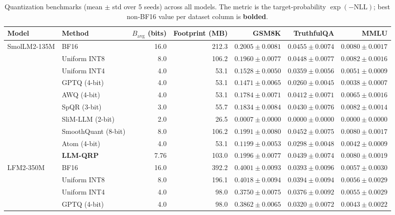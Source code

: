 \begin{table}[htbp]
  \centering
  \small
\caption{Quantization benchmarks (mean $\pm$ std over 5 seeds) across all models. The metric is the target-probability $\exp(-\text{NLL})$; best non-BF16 value per dataset column is \textbf{bolded}.}
  \label{tab:multiseed}
  \begin{tabular}{llrrrrr}
    \toprule
    \textbf{Model} & \textbf{Method} & $B_{\mathrm{avg}}$ (bits) & \textbf{Footprint (MB)} & \textbf{GSM8K} & \textbf{TruthfulQA} & \textbf{MMLU} \\
    \midrule
    SmolLM2-135M & BF16 & 16.0 & 212.3 & $0.2005 \pm 0.0081$ & $0.0455 \pm 0.0074$ & $0.0080 \pm 0.0017$ \\
     & Uniform INT8 & 8.0 & 106.2 & $0.1960 \pm 0.0077$ & $0.0448 \pm 0.0077$ & $0.0082 \pm 0.0016$ \\
     & Uniform INT4 & 4.0 & 53.1 & $0.1528 \pm 0.0050$ & $0.0359 \pm 0.0056$ & $0.0051 \pm 0.0009$ \\
     & GPTQ (4-bit) & 4.0 & 53.1 & $0.1471 \pm 0.0065$ & $0.0260 \pm 0.0045$ & $0.0038 \pm 0.0007$ \\
     & AWQ (4-bit) & 4.0 & 53.1 & $0.1784 \pm 0.0071$ & $0.0412 \pm 0.0071$ & $0.0065 \pm 0.0016$ \\
     & SpQR (3-bit) & 3.0 & 55.7 & $0.1834 \pm 0.0084$ & $0.0430 \pm 0.0076$ & \textbf{$0.0082 \pm 0.0014$} \\
     & SliM-LLM (2-bit) & 2.0 & 26.5 & $0.0007 \pm 0.0000$ & $0.0000 \pm 0.0000$ & $0.0000 \pm 0.0000$ \\
     & SmoothQuant (8-bit) & 8.0 & 106.2 & $0.1991 \pm 0.0080$ & \textbf{$0.0452 \pm 0.0075$} & $0.0080 \pm 0.0017$ \\
     & Atom (4-bit) & 4.0 & 53.1 & $0.1199 \pm 0.0053$ & $0.0298 \pm 0.0048$ & $0.0042 \pm 0.0009$ \\
     & \textbf{LLM-QRP} & 7.76 & 103.0 & \textbf{$0.1996 \pm 0.0077$} & $0.0439 \pm 0.0074$ & $0.0080 \pm 0.0019$ \\
    \midrule
    LFM2-350M & BF16 & 16.0 & 392.2 & $0.4001 \pm 0.0093$ & $0.0393 \pm 0.0096$ & $0.0057 \pm 0.0030$ \\
     & Uniform INT8 & 8.0 & 196.1 & \textbf{$0.4018 \pm 0.0094$} & $0.0394 \pm 0.0094$ & $0.0056 \pm 0.0029$ \\
     & Uniform INT4 & 4.0 & 98.0 & $0.3750 \pm 0.0075$ & $0.0376 \pm 0.0092$ & $0.0055 \pm 0.0029$ \\
     & GPTQ (4-bit) & 4.0 & 98.0 & $0.3862 \pm 0.0065$ & $0.0320 \pm 0.0072$ & $0.0043 \pm 0.0022$ \\

\end{tabular}
\end{table}
